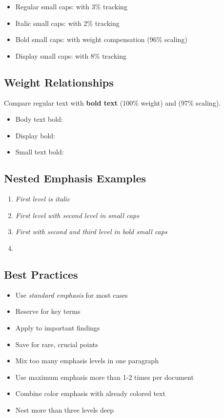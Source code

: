 \documentclass{article}
\begin{document}
\begin{itemize}
\item Regular small caps:  with 3\% tracking
\item Italic small caps:  with 2\% tracking  
\item Bold small caps:  with weight compensation (96\% scaling)
\item Display small caps:  with 8\% tracking
\end{itemize}

\subsection{Weight Relationships}

Compare regular text with \textbf{bold text} (100\% weight) and  (97\% scaling).

\begin{itemize}
\item Body text bold: 
\item Display bold:  
\item Small text bold: 
\end{itemize}

\subsection{Nested Emphasis Examples}

\begin{enumerate}
\item \emph{First level is italic}
\item \emph{First level with \emph{second level} in small caps}
\item \emph{First with \emph{second and \emph{third level}} in bold small caps}
\item {}
\end{enumerate}

\subsection{Best Practices}

\begin{itemize}
\item Use \emph{standard emphasis} for most cases
\item Reserve  for key terms
\item Apply  to important findings
\item Save  for rare, crucial points
\end{itemize}

\begin{itemize}
\item Mix too many emphasis levels in one paragraph
\item Use maximum emphasis more than 1-2 times per document
\item Combine color emphasis with already colored text
\item Nest more than three levels deep
\end{itemize}
\end{document}
